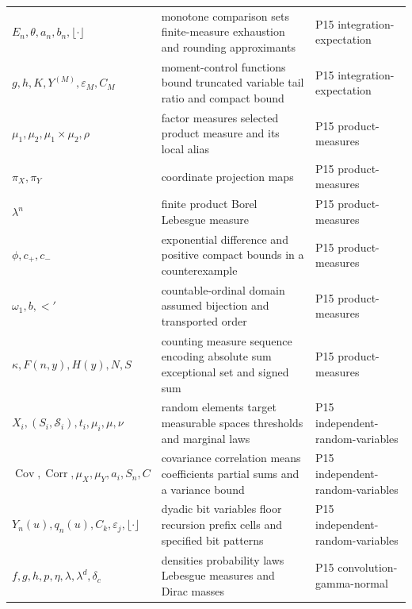 \begin{longtable}{@{}p{}p{}p{}@{}}
\(E_n,\allowbreak \theta,\allowbreak a_n,\allowbreak b_n,\allowbreak \lfloor\cdot\rfloor\) & monotone comparison sets finite-measure exhaustion and rounding approximants & P15 integration-\allowbreak{}expectation \\
\(g,\allowbreak h,\allowbreak K,\allowbreak Y^{(M)},\allowbreak \varepsilon_M,\allowbreak C_M\) & moment-control functions bound truncated variable tail ratio and compact bound & P15 integration-\allowbreak{}expectation \\
\(\mu_1,\allowbreak \mu_2,\allowbreak \mu_1\times\mu_2,\allowbreak \rho\) & factor measures selected product measure and its local alias & P15 product-\allowbreak{}measures \\
\(\pi_X,\allowbreak \pi_Y\) & coordinate projection maps & P15 product-\allowbreak{}measures \\
\(\lambda^n\) & finite product Borel Lebesgue measure & P15 product-\allowbreak{}measures \\
\(\phi,\allowbreak c_+,\allowbreak c_-\) & exponential difference and positive compact bounds in a counterexample & P15 product-\allowbreak{}measures \\
\(\omega_1,\allowbreak b,\allowbreak <'\) & countable-ordinal domain assumed bijection and transported order & P15 product-\allowbreak{}measures \\
\(\kappa,\allowbreak F(n,\allowbreak y),\allowbreak H(y),\allowbreak N,\allowbreak S\) & counting measure sequence encoding absolute sum exceptional set and signed sum & P15 product-\allowbreak{}measures \\
\(X_i,\allowbreak (S_i,\allowbreak \mathcal S_i),\allowbreak t_i,\allowbreak \mu_i,\allowbreak \mu,\allowbreak \nu\) & random elements target measurable spaces thresholds and marginal laws & P15 independent-\allowbreak{}random-\allowbreak{}variables \\
\(\operatorname{Cov},\allowbreak \operatorname{Corr},\allowbreak \mu_X,\allowbreak \mu_Y,\allowbreak a_i,\allowbreak S_n,\allowbreak C\) & covariance correlation means coefficients partial sums and a variance bound & P15 independent-\allowbreak{}random-\allowbreak{}variables \\
\(Y_n(u),\allowbreak q_n(u),\allowbreak C_k,\allowbreak \varepsilon_j,\allowbreak \lfloor\cdot\rfloor\) & dyadic bit variables floor recursion prefix cells and specified bit patterns & P15 independent-\allowbreak{}random-\allowbreak{}variables \\
\(f,\allowbreak g,\allowbreak h,\allowbreak p,\allowbreak \eta,\allowbreak \lambda,\allowbreak \lambda^d,\allowbreak \delta_c\) & densities probability laws Lebesgue measures and Dirac masses & P15 convolution-\allowbreak{}gamma-\allowbreak{}normal \\

\end{longtable}
